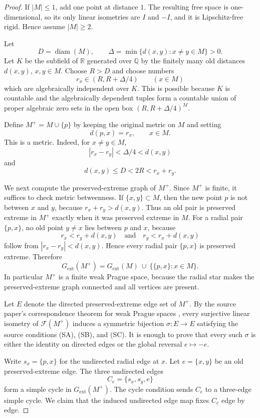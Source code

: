 \documentclass[11pt]{article}
\newcommand{\F}{\mathcal F}
\newcommand{\diam}{\operatorname{diam}}
\newcommand{\Q}{\mathbb Q}
\begin{document}
\begin{proof}
If \(|M|\leq 1\), add one point at distance \(1\).  The resulting free space is one-dimensional, so its only linear isometries are \(I\) and \(-I\), and it is Lipschitz-free rigid.  Hence assume \(|M|\geq 2\).

Let
\[
  D=\diam(M),\qquad
  \Delta=\min\{d(x,y):x\neq y\in M\}>0.
\]
Let \(K\) be the subfield of \(\mathbb R\) generated over \(\Q\) by the finitely many old distances \(d(x,y)\), \(x,y\in M\).  Choose \(R>D\) and choose numbers
\[
  r_x\in (R,R+\Delta/4)\qquad (x\in M)
\]
which are algebraically independent over \(K\).  This is possible because \(K\) is countable and the algebraically dependent tuples form a countable union of proper algebraic zero sets in the open box \((R,R+\Delta/4)^M\).

Define \(M^+=M\cup\{p\}\) by keeping the original metric on \(M\) and setting
\[
  d(p,x)=r_x,\qquad x\in M.
\]
This is a metric.  Indeed, for \(x\neq y\in M\),
\[
  |r_x-r_y|<\Delta/4<d(x,y)
\]
and
\[
  d(x,y)\leq D<2R<r_x+r_y.
\]

We next compute the preserved-extreme graph of \(M^+\).  Since \(M^+\) is finite, it suffices to check metric betweenness.  If \(\{x,y\}\subset M\), then the new point \(p\) is not between \(x\) and \(y\), because \(r_x+r_y>d(x,y)\).  Thus an old pair is preserved extreme in \(M^+\) exactly when it was preserved extreme in \(M\).  For a radial pair \(\{p,x\}\), no old point \(y\neq x\) lies between \(p\) and \(x\), because
\[
  r_x<r_y+d(x,y)
  \quad\text{and}\quad
  r_y<r_x+d(x,y)
\]
follow from \(|r_x-r_y|<d(x,y)\).  Hence every radial pair \(\{p,x\}\) is preserved extreme.  Therefore
\[
  G_{\mathrm{ext}}(M^+)
  =
  G_{\mathrm{ext}}(M)\ \cup\ \{\{p,x\}:x\in M\}.
\]
In particular \(M^+\) is a finite weak Prague space, because the radial star makes the preserved-extreme graph connected and all vertices are present.

Let \(E\) denote the directed preserved-extreme edge set of \(M^+\).  By the source paper's correspondence theorem for weak Prague spaces \cite[Theorem 3.4]{CDT}, every surjective linear isometry of \(\F(M^+)\) induces a symmetric bijection \(\sigma:E\to E\) satisfying the source conditions (SA), (SB), and (SC).  It is enough to prove that every such \(\sigma\) is either the identity on directed edges or the global reversal \(e\mapsto -e\).

Write \(s_x=\{p,x\}\) for the undirected radial edge at \(x\).  Let \(e=\{x,y\}\) be an old preserved-extreme edge.  The three undirected edges
\[
  C_e=\{s_x,s_y,e\}
\]
form a simple cycle in \(G_{\mathrm{ext}}(M^+)\).  The cycle condition sends \(C_e\) to a three-edge simple cycle.  We claim that the induced undirected edge map fixes \(C_e\) edge by edge.


\end{proof}
\end{document}
